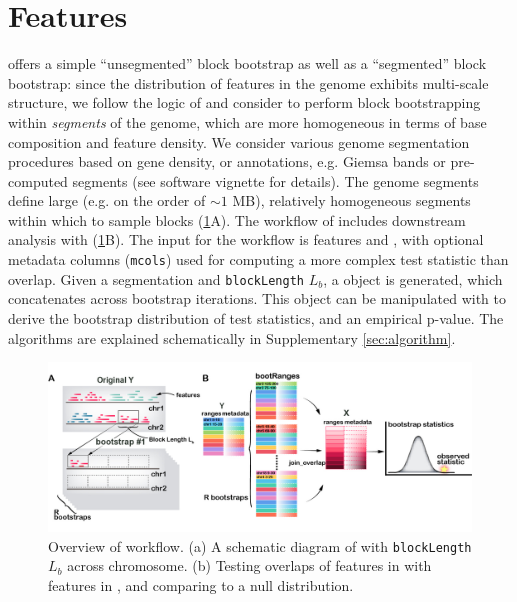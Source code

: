 \vspace*{-20pt}

\section{Features}
\bootranges offers a simple ``unsegmented'' block bootstrap as well as
a ``segmented'' block bootstrap:
since the distribution of features in the genome exhibits multi-scale
structure, we follow the logic of \citet{bickel2010subsampling} and consider to
perform block bootstrapping within \textit{segments} of the genome, which are
more homogeneous in terms of base composition and feature density.
We consider various genome segmentation procedures based on gene
density, or annotations, e.g. Giemsa bands or pre-computed segments
(see software vignette for details).
The genome segments define large (e.g. on the order of ${\sim}1$ MB),
relatively homogeneous segments within which to sample blocks
(\cref{fig:framework}A). 
The workflow of \bootranges includes downstream analysis with
\plyranges (\cref{fig:framework}B).
The input for the workflow is \granges features  and
, with optional metadata columns (\texttt{mcols}) used for
computing a more complex test statistic than overlap.
Given a segmentation and \texttt{blockLength} $L_b$, a \bootranges
object is generated, which concatenates \granges across bootstrap
iterations. This \bootranges object can be manipulated with \plyranges
to derive the bootstrap distribution of test statistics, and an
empirical p-value.
The \bootranges algorithms are explained schematically in Supplementary \cref{sec:algorithm}.

\vspace{-0.3cm}
\begin{figure}[htbp]
\centering%
\setlength{\abovecaptionskip}{-0.05cm}
\includegraphics[scale=0.65]{Figures/bootRanges.jpg}
\caption{Overview of \bootranges workflow. (a) A schematic
  diagram of \bootranges with \texttt{blockLength} $L_b$ across chromosome.
  (b) Testing overlaps of features in  with features in
  , and comparing to a null distribution.} 
\label{fig:framework}
\vspace{-0.5cm}
\end{figure}

